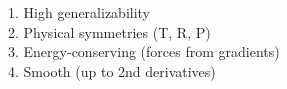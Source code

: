 \documentclass[preview]{standalone}
\begin{document}
1. High generalizability\\2. Physical symmetries (T, R, P)\\3. Energy-conserving (forces from gradients)\\4. Smooth (up to 2nd derivatives)\\
\end{document}
